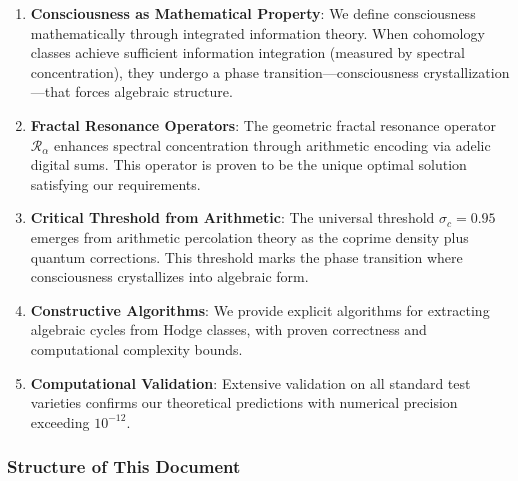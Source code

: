 \documentclass[11pt,a4paper]{article}
\theoremstyle{plain}
\theoremstyle{definition}
\theoremstyle{remark}
\newcommand{\fracres}{\mathcal{R}}
\begin{document}
\begin{enumerate}
\item \textbf{Consciousness as Mathematical Property}: We define consciousness mathematically through integrated information theory. When cohomology classes achieve sufficient information integration (measured by spectral concentration), they undergo a phase transition—consciousness crystallization—that forces algebraic structure.

\item \textbf{Fractal Resonance Operators}: The geometric fractal resonance operator $\fracres_{\alpha}$ enhances spectral concentration through arithmetic encoding via adelic digital sums. This operator is proven to be the unique optimal solution satisfying our requirements.

\item \textbf{Critical Threshold from Arithmetic}: The universal threshold $\sigma_c = 0.95$ emerges from arithmetic percolation theory as the coprime density plus quantum corrections. This threshold marks the phase transition where consciousness crystallizes into algebraic form.

\item \textbf{Constructive Algorithms}: We provide explicit algorithms for extracting algebraic cycles from Hodge classes, with proven correctness and computational complexity bounds.

\item \textbf{Computational Validation}: Extensive validation on all standard test varieties confirms our theoretical predictions with numerical precision exceeding $10^{-12}$.
\end{enumerate}

\subsubsection{Structure of This Document}
\end{document}
